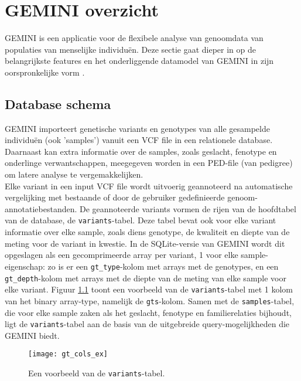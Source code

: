 \chapter{GEMINI overzicht}
\label{gemini_beschrijving}

GEMINI is een applicatie voor de flexibele analyse van genoomdata van populaties van menselijke individu\"en. Deze sectie gaat dieper in op de belangrijkste features en het onderliggende datamodel van GEMINI in zijn oorspronkelijke vorm \cite{10.1371/journal.pcbi.1003153}\cite{gemini_docs}.

\section{Database schema}

GEMINI importeert genetische variants en genotypes van alle gesampelde individu\"en (ook 'samples') vanuit een VCF file in een relationele database.
Daarnaast kan extra informatie over de samples, zoals geslacht, fenotype en onderlinge verwantschappen, meegegeven worden in een PED-file (van pedigree) om latere analyse te vergemakkelijken.\\

Elke variant in een input VCF file wordt uitvoerig geannoteerd na automatische vergelijking met bestaande of door de gebruiker gedefinieerde genoom-annotatiebestanden. De geannoteerde variants vormen de rijen van de hoofdtabel van de database, de \texttt{variants}-tabel. Deze tabel bevat ook voor elke variant informatie over elke sample, zoals diens genotype, de kwaliteit en diepte van de meting voor de variant in kwestie. In de SQLite-versie van GEMINI wordt dit opgeslagen als een gecomprimeerde array per variant, 1 voor elke sample-eigenschap: zo is er een \texttt{gt\_type}-kolom met arrays met de genotypes, en een \texttt{gt\_depth}-kolom met arrays met de diepte van de meting van elke sample voor elke variant. Figuur \ref{gt_cols_ex} toont een voorbeeld van de \texttt{variants}-tabel met 1 kolom van het binary array-type, namelijk de \texttt{gts}-kolom. Samen met de \texttt{samples}-tabel, die voor elke sample zaken als het geslacht, fenotype en familierelaties bijhoudt, ligt de \texttt{variants}-tabel aan de basis van de uitgebreide query-mogelijkheden die GEMINI biedt.\\

\begin{figure}[!h]
\texttt{[image: gt\_cols\_ex]}
\caption{Een voorbeeld van de \texttt{variants}-tabel.}
\label{gt_cols_ex}
\end{figure}

